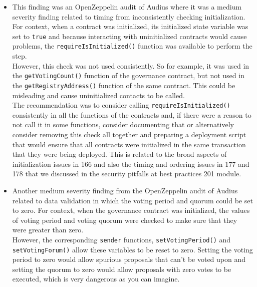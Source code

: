 \begin{itemize}
\item
  This finding was an OpenZeppelin audit of Audius where it was a medium
  severity finding related to timing from inconsistently checking
  initialization. For context, when a contract was initialized, its
  initialized state variable was set to \texttt{true} and because
  interacting with uninitialized contracts would cause problems, the
  \texttt{requireIsInitialized()} function was available to perform the
  step.\\

  However, this check was not used consistently. So for example, it was
  used in the \texttt{getVotingCount()} function of the governance
  contract, but not used in the \texttt{getRegistryAddress()} function
  of the same contract. This could be misleading and cause uninitialized
  contacts to be called.\\

  The recommendation was to consider calling
  \texttt{requireIsInitialized()} consistently in all the functions of
  the contracts and, if there were a reason to not call it in some
  functions, consider documenting that or alternatively consider
  removing this check all together and preparing a deployment script
  that would ensure that all contracts were initialized in the same
  transaction that they were being deployed. This is related to the
  broad aspects of initialization issues in 166 and also the timing and
  ordering issues in 177 and 178 that we discussed in the security
  pitfalls at best practices 201 module.
\item
  Another medium severity finding from the OpenZeppelin audit of Audius
  related to data validation in which the voting period and quorum could
  be set to zero. For context, when the governance contract was
  initialized, the values of voting period and voting quorum were
  checked to make sure that they were greater than zero.\\

  However, the corresponding \texttt{sender} functions,
  \texttt{setVotingPeriod()} and \texttt{setVotingForum()} allow these
  variables to be reset to zero. Setting the voting period to zero would
  allow spurious proposals that can't be voted upon and setting the
  quorum to zero would allow proposals with zero votes to be executed,
  which is very dangerous as you can imagine.\\


\end{itemize}

